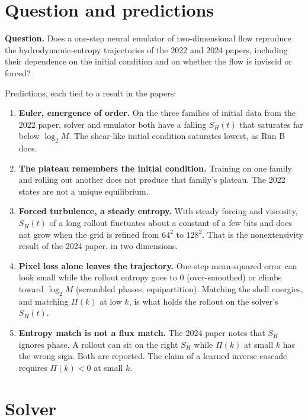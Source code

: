 \documentclass[11pt,a4paper]{article}
\begin{document}
\section{Question and predictions}

\textbf{Question.}
Does a one-step neural emulator of two-dimensional flow reproduce the hydrodynamic-entropy trajectories of the 2022 and 2024 papers, including their dependence on the initial condition and on whether the flow is inviscid or forced?

Predictions, each tied to a result in the papers:

\begin{enumerate}
  \item \textbf{Euler, emergence of order.}
  On the three families of initial data from the 2022 paper, solver and emulator both have a falling \(S_H(t)\) that saturates far below \(\log_2 M\).
  The shear-like initial condition saturates lowest, as Run B does.

  \item \textbf{The plateau remembers the initial condition.}
  Training on one family and rolling out another does not produce that family's plateau.
  The 2022 states are not a unique equilibrium.

  \item \textbf{Forced turbulence, a steady entropy.}
  With steady forcing and viscosity, \(S_H(t)\) of a long rollout fluctuates about a constant of a few bits and does not grow when the grid is refined from \(64^2\) to \(128^2\).
  That is the nonextensivity result of the 2024 paper, in two dimensions.

  \item \textbf{Pixel loss alone leaves the trajectory.}
  One-step mean-squared error can look small while the rollout entropy goes to \(0\) (over-smoothed) or climbs toward \(\log_2 M\) (scrambled phases, equipartition).
  Matching the shell energies, and matching \(\Pi(k)\) at low \(k\), is what holds the rollout on the solver's \(S_H(t)\).

  \item \textbf{Entropy match is not a flux match.}
  The 2024 paper notes that \(S_H\) ignores phase.
  A rollout can sit on the right \(S_H\) while \(\Pi(k)\) at small \(k\) has the wrong sign.
  Both are reported. The claim of a learned inverse cascade requires \(\Pi(k)<0\) at small \(k\).
\end{enumerate}

\section{Solver}
\end{document}
